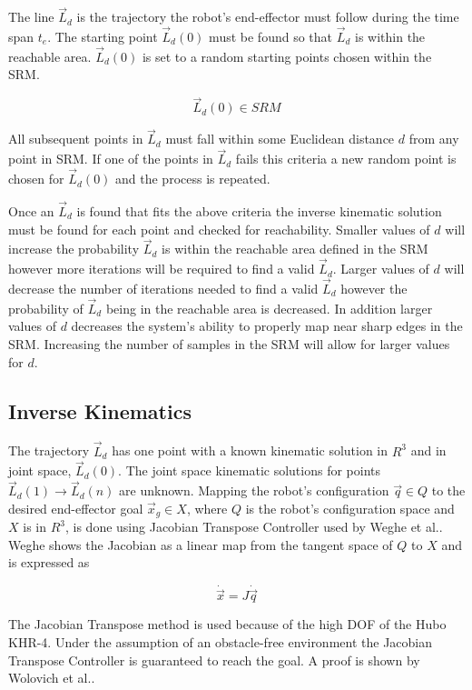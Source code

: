 The line $\vec{L}_d$ is the trajectory the robot's end-effector must follow during the time span $t_e$.  The starting point $\vec{L}_d(0)$ must be found so that $\vec{L}_d$ is within the reachable area.  $\vec{L}_d(0)$ is set to a random starting points chosen within the SRM.  

\begin{equation}
\vec{L}_d(0) \in SRM
\end{equation}

All subsequent points in $\vec{L}_d$ must fall within some Euclidean distance $d$ from any point in SRM.  If one of the points in $\vec{L}_d$ fails this criteria a new random point is chosen for $\vec{L}_d(0)$ and the process is repeated. 

Once an $\vec{L}_d$ is found that fits the above criteria the inverse kinematic solution must be found for each point and checked for reachability.  Smaller values of $d$ will increase the probability $\vec{L}_d$ is within the reachable area defined in the SRM however more iterations will be required to find a valid $\vec{L}_d$.  Larger values of $d$ will decrease the number of iterations needed to find a valid $\vec{L}_d$ however the probability of $\vec{L}_d$ being in the reachable area is decreased.  In addition larger values of $d$ decreases the system's ability to properly map near sharp edges in the SRM.  Increasing the number of samples in the SRM will allow for larger values for $d$.

\subsection{Inverse Kinematics}\label{sec:ik}
The trajectory $\vec{L}_d$ has one point with a known kinematic solution in $R^3$ and in joint space, $\vec{L}_d(0)$.  The joint space kinematic solutions for points $\vec{L}_d(1) \rightarrow \vec{L}_d(n)$ are unknown.  Mapping the robot's configuration $\vec{q} \in Q$ to the desired end-effector goal $\vec{x}_g \in X$, where $Q$ is the robot's configuration space and $X$ is in $R^3$, is done using Jacobian Transpose Controller used by Weghe et al.\cite{4813913}.  Weghe shows the Jacobian as a linear map from the tangent space of $Q$ to $X$ and is expressed as

\begin{equation}
\dot{\vec{x}} = J\dot{\vec{q}}
\end{equation}

  The Jacobian Transpose method is used because of the high DOF of the Hubo KHR-4.  Under the assumption of an obstacle-free environment the Jacobian Transpose Controller is guaranteed to reach the goal.  A proof is shown by Wolovich et al.\cite{4048118}.

